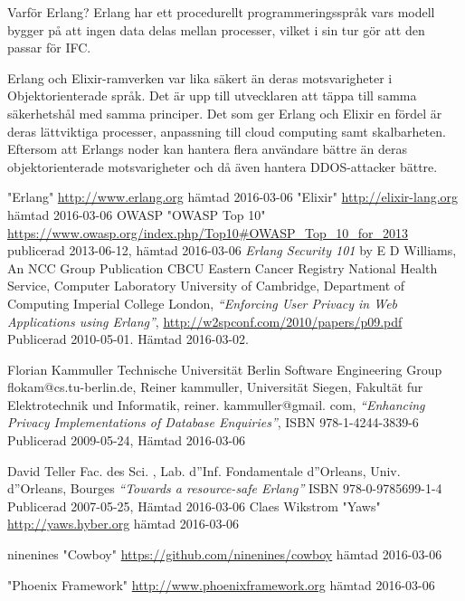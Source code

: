 \documentclass[12pt]{article}
\begin{document}
Varför Erlang? Erlang har ett procedurellt programmeringsspråk vars modell bygger på att ingen data delas mellan processer, vilket i sin tur gör att den passar för IFC.

Erlang och Elixir-ramverken var lika säkert än deras motsvarigheter i Objektorienterade språk. 
Det är upp till utvecklaren att täppa till samma säkerhetshål med samma principer. 
Det som ger Erlang och Elixir en fördel är deras lättviktiga processer, anpassning till cloud computing samt skalbarheten. Eftersom att Erlangs noder  
kan hantera flera användare bättre än deras objektorienterade motsvarigheter och då även hantera DDOS-attacker bättre.

	
\begin{thebibliography}{99}
	
	"Erlang" \url{http://www.erlang.org}
hämtad 2016-03-06
"Elixir" \url{http://elixir-lang.org}
hämtad 2016-03-06
 OWASP "OWASP Top 10" \url{https://www.owasp.org/index.php/Top10#OWASP_Top_10_for_2013}
publicerad 2013-06-12,
hämtad 2016-03-06
     {\em Erlang Security 101} by E D Williams, An NCC Group Publication
 CBCU Eastern Cancer Registry National Health Service, Computer Laboratory University of Cambridge, Department of Computing Imperial College London, {\em “Enforcing User Privacy in Web Applications using Erlang”}, \url{http://w2spconf.com/2010/papers/p09.pdf} Publicerad 2010-05-01.
 Hämtad 2016-03-02.
				
Florian Kammuller Technische Universität Berlin Software Engineering Group flokam@cs.tu-berlin.de, Reiner kammuller, Universität Siegen, Fakultät fur Elektrotechnik und Informatik, reiner.
kammuller@gmail.
com, {\em “Enhancing Privacy Implementations of Database Enquiries”}, ISBN 978-1-4244-3839-6 Publicerad 2009-05-24, Hämtad 2016-03-06

David Teller Fac.
 des Sci.
, Lab.
 d''Inf.
 Fondamentale d''Orleans, Univ.
 d''Orleans, Bourges {\em “Towards a resource-safe Erlang”} ISBN 978-0-9785699-1-4 Publicerad 2007-05-25, Hämtad 2016-03-06			
     Claes Wikstrom "Yaws" \url{http://yaws.hyber.org}
hämtad 2016-03-06

ninenines "Cowboy" \url{https://github.com/ninenines/cowboy}
hämtad 2016-03-06


  "Phoenix Framework" \url{http://www.phoenixframework.org}
hämtad 2016-03-06


\end{thebibliography}
\end{document}
